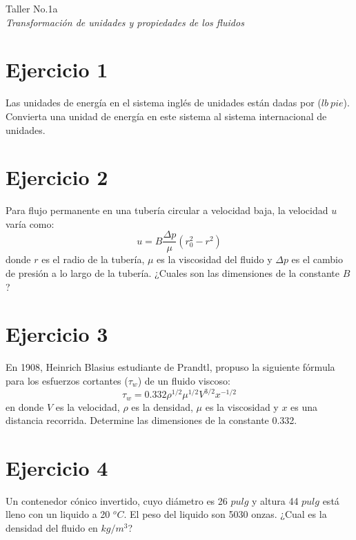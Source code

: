 \documentclass[12pt]{article}
\begin{document}
\begin{center}
\Large Taller No.1a\\ \emph{Transformaci\'on de unidades y propiedades de los fluidos}
\end{center}


\section*{Ejercicio 1}\vspace{-0.3cm}
Las unidades de energ\'ia en el sistema ingl\'es de unidades est\'an dadas por ($lb\ pie$). Convierta una unidad de energ\'ia en este sistema al sistema internacional de unidades.

\section*{Ejercicio 2}\vspace{-0.3cm}
Para flujo permanente en una tuber\'ia circular a velocidad baja, la velocidad $u$ var\'ia como:
$$
u = B\frac{\Delta p}{\mu}(r^2_0 - r^2)
$$
donde $r$ es el radio de la tuber\'ia, $\mu$ es la viscosidad del fluido y $\Delta p$ es el cambio de presi\'on a lo largo de la tuber\'ia. ¿Cuales son las dimensiones de la constante $B$? 

\section*{Ejercicio 3}\vspace{-0.3cm}
En 1908, Heinrich Blasius estudiante de Prandtl, propuso la siguiente f\'ormula para los esfuerzos cortantes ($\tau_w$) de un fluido viscoso:
$$
\tau_w = 0.332\rho^{1/2}\mu^{1/2}V^{3/2}x^{-1/2}
$$
en donde $V$ es la velocidad, $\rho$ es la densidad, $\mu$ es la viscosidad y $x$ es una distancia recorrida. Determine las dimensiones de la constante 0.332.


\section*{Ejercicio 4}\vspace{-0.3cm}
Un contenedor c\'onico invertido, cuyo di\'ametro es 26 $pulg$ y altura 44 $pulg$ est\'a lleno con un liquido a 20 $^oC$. El peso del liquido son 5030 onzas. ¿Cual es la densidad del fluido en $kg/m^3$?
\end{document}
